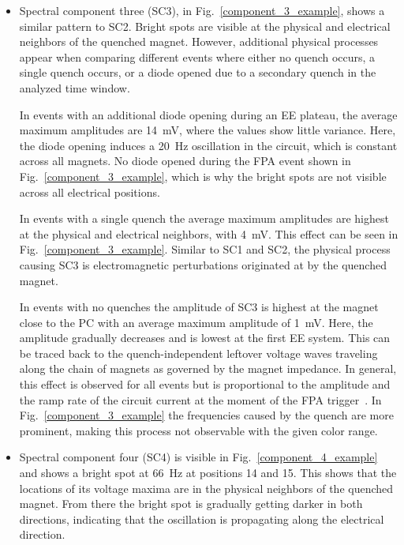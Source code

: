 \documentclass[lettersize,journal]{IEEEtran}
\begin{document}
\begin{itemize}
    \item Spectral component three (SC3), in Fig.~\ref{component_3_example}, shows a similar pattern to SC2.
    Bright spots are visible at the physical and electrical neighbors of the quenched magnet.
    However, additional physical processes appear when comparing different events where either no quench occurs, a single quench occurs, or a diode opened due to a secondary quench in the analyzed time window.
    
    In events with an additional diode opening during an EE plateau, the average maximum amplitudes are 14~mV, where the values show little variance.
    Here, the diode opening induces a 20~Hz oscillation in the circuit, which is constant across all magnets.
    No diode opened during the FPA event shown in Fig.~\ref{component_3_example}, which is why the bright spots are not visible across all electrical positions.
    
    In events with a single quench the average maximum amplitudes are highest at the physical and electrical neighbors, with 4~mV.
    This effect can be seen in Fig.~\ref{component_3_example}.
    Similar to SC1 and SC2, the physical process causing SC3 is electromagnetic perturbations originated at by the quenched magnet.
    
    In events with no quenches the amplitude of SC3 is highest at the magnet close to the PC with an average maximum amplitude of 1~mV. 
    Here, the amplitude gradually decreases and is lowest at the first EE system.
    This can be traced back to the quench-independent leftover voltage waves traveling along the chain of magnets as governed by the magnet impedance.
    In general, this effect is observed for all events but is proportional to the amplitude and the ramp rate of the circuit current at the moment of the FPA trigger~\cite{janitschke2021framework}.
    In Fig.~\ref{component_3_example} the frequencies caused by the quench are more prominent, making this process not observable with the given color range.
    
    \item Spectral component four (SC4) is visible in Fig.~\ref{component_4_example} and shows a bright spot at 66~Hz at positions 14 and 15.
    This shows that the locations of its voltage maxima are in the physical neighbors of the quenched magnet.
    From there the bright spot is gradually getting darker in both directions, indicating that the oscillation is propagating along the electrical direction.
    


\end{itemize}
\end{document}
